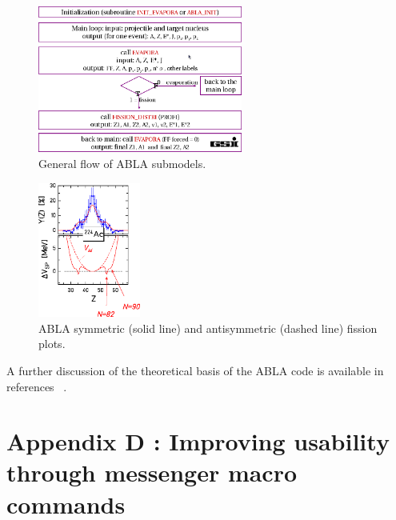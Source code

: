 
\begin{figure}[h] 
\begin{center}
\includegraphics[width=0.6\textwidth]{images/AblaTable.png}  
\caption{\label{fig:ablatable} General flow of ABLA submodels.}
 
 \end{center}
 \end{figure}
\begin{figure}[h] 
\begin{center}
\includegraphics[width=0.3\textwidth]{images/AblaHumps.png}  
\caption{\label{fig:ablahumps} ABLA symmetric (solid line) and antisymmetric (dashed line) fission plots.}
 
 \end{center}
 \end{figure}

A further discussion of the theoretical basis of the ABLA code is available in references ~\cite{ablatalk,iia}.

\clearpage

\section*{Appendix D \label{AppendixD}: Improving usability through messenger macro commands}

